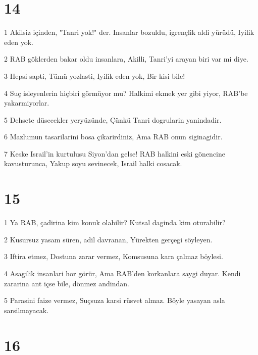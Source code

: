 \chapter{14}

\par 1 Akilsiz içinden, "Tanri yok!" der. Insanlar bozuldu, igrençlik aldi yürüdü, Iyilik eden yok.
\par 2 RAB göklerden bakar oldu insanlara, Akilli, Tanri'yi arayan biri var mi diye.
\par 3 Hepsi sapti, Tümü yozlasti, Iyilik eden yok, Bir kisi bile!
\par 4 Suç isleyenlerin hiçbiri görmüyor mu? Halkimi ekmek yer gibi yiyor, RAB'be yakarmiyorlar.
\par 5 Dehsete düsecekler yeryüzünde, Çünkü Tanri dogrularin yanindadir.
\par 6 Mazlumun tasarilarini bosa çikarirdiniz, Ama RAB onun siginagidir.
\par 7 Keske Israil'in kurtulusu Siyon'dan gelse! RAB halkini eski gönencine kavusturunca, Yakup soyu sevinecek, Israil halki cosacak.

\chapter{15}

\par 1 Ya RAB, çadirina kim konuk olabilir? Kutsal daginda kim oturabilir?
\par 2 Kusursuz yasam süren, adil davranan, Yürekten gerçegi söyleyen.
\par 3 Iftira etmez, Dostuna zarar vermez, Komsusuna kara çalmaz böylesi.
\par 4 Asagilik insanlari hor görür, Ama RAB'den korkanlara saygi duyar. Kendi zararina ant içse bile, dönmez andindan.
\par 5 Parasini faize vermez, Suçsuza karsi rüsvet almaz. Böyle yasayan asla sarsilmayacak.

\chapter{16}

